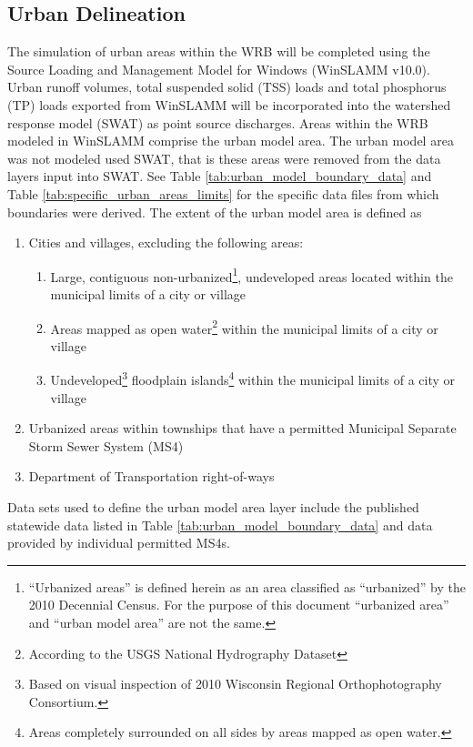 
\subsection{Urban Delineation}\label{sec:urban}
The simulation of urban areas within the WRB will be completed using the Source Loading and Management Model for Windows (WinSLAMM v10.0). Urban runoff volumes, total suspended solid (TSS) loads and total phosphorus (TP) loads exported from WinSLAMM will be incorporated into the watershed response model (SWAT) as point source discharges. Areas within the WRB modeled in WinSLAMM comprise the urban model area. The urban model area was not modeled used SWAT, that is these areas were removed from the data layers input into SWAT. See Table \ref{tab:urban_model_boundary_data} and Table \ref{tab:specific_urban_areas_limits} for the specific data files from which boundaries were derived. The extent of the urban model area is defined as 

\begin{enumerate}
	\item Cities and villages, excluding the following areas:
	\begin{enumerate}
		\item Large, contiguous non-urbanized\footnote{``Urbanized areas'' is defined herein as an area classified as ``urbanized'' by the 2010 Decennial Census. For the purpose of this document ``urbanized area'' and ``urban model area'' are not the same.}, undeveloped areas located within the municipal limits of a city or village
		\item Areas mapped as open water\footnote{According to the USGS National Hydrography Dataset} within the municipal limits of a city or village
		\item Undeveloped\footnote{Based on visual inspection of 2010 Wisconsin Regional Orthophotography Consortium.} floodplain islands\footnote{Areas completely surrounded on all sides by areas mapped as open water.} within the municipal limits of a city or village
	\end{enumerate}

	\item Urbanized areas within townships that have a permitted Municipal Separate Storm Sewer System (MS4)
	\item Department of Transportation right-of-ways
\end{enumerate}

Data sets used to define the urban model area layer include the published statewide data listed in Table \ref{tab:urban_model_boundary_data} and data provided by individual permitted MS4s.



